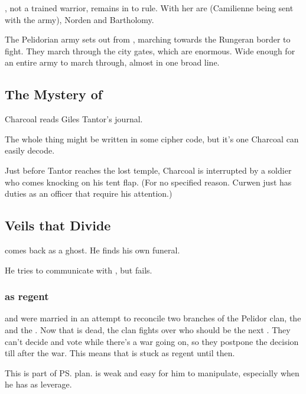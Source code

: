 \Tiroco{}, not a trained warrior, remains in \Malcur to rule. 
With her are \Vincerre{} (Camilienne being sent with the army), Norden and Bartholomy. 

The Pelidorian army sets out from \Malcur, marching towards the Rungeran border to fight. 
They march through the \Malcuric{} city gates, which are enormous. 
Wide enough for an entire army to march through, almost in one broad line. 











\subsection{The Mystery of \EreshKal}
Charcoal reads Giles Tantor's journal. 

The whole thing might be written in some cipher code, but it's one Charcoal can easily decode. 

Just before Tantor reaches the lost temple, Charcoal is interrupted by a soldier who comes knocking on his tent flap. (For no specified reason. Curwen just has duties as an officer that require his attention.)







\subsection{Veils that Divide} 
\Icor{} comes back as a ghost. 
He finds his own funeral. 

He tries to communicate with \Tiroco, but fails.





\subsubsection{\Tiroco{} as regent}
\Tiroco{} and \Icor{} were married in an attempt to reconcile two branches of the Pelidor clan, the \Malcurians{} and the \Forcliners. 
Now that \Icor{} is dead, the clan fights over who should be the next \rayuth. 
They can't decide and vote while there's a war going on, so they postpone the decision till after the war. 
This means that \Tiroco{} is stuck as regent until then. 

This is part of \ps{\Psyrex}{} plan. 
\Tiroco{} is weak and easy for him to manipulate, especially when he has \Icor{} as leverage. 







